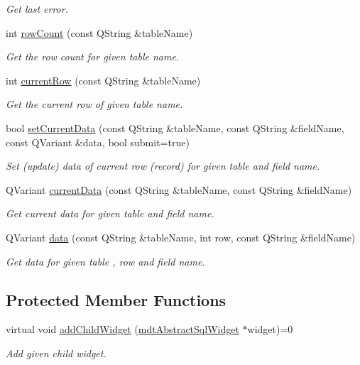 \begin{DoxyCompactItemize}
\begin{DoxyCompactList}\small\item\em Get last error. \end{DoxyCompactList}\item 
int \hyperlink{classmdt_sql_form_old_a859f22cee8de55dbc7111c85ee18cf94}{rowCount} (const QString \&tableName)
\begin{DoxyCompactList}\small\item\em Get the row count for given table name. \end{DoxyCompactList}\item 
int \hyperlink{classmdt_sql_form_old_a02f127ffff2add79efbdbe53b4294fd9}{currentRow} (const QString \&tableName)
\begin{DoxyCompactList}\small\item\em Get the current row of given table name. \end{DoxyCompactList}\item 
bool \hyperlink{classmdt_sql_form_old_a53239c8640705c64ad0d64e1737a0e9b}{setCurrentData} (const QString \&tableName, const QString \&fieldName, const QVariant \&data, bool submit=true)
\begin{DoxyCompactList}\small\item\em Set (update) data of current row (record) for given table and field name. \end{DoxyCompactList}\item 
QVariant \hyperlink{classmdt_sql_form_old_a70bf128500ad9f8a977124ffea58ec80}{currentData} (const QString \&tableName, const QString \&fieldName)
\begin{DoxyCompactList}\small\item\em Get current data for given table and field name. \end{DoxyCompactList}\item 
QVariant \hyperlink{classmdt_sql_form_old_aa86bf23666adb34e71b4a69e60717528}{data} (const QString \&tableName, int row, const QString \&fieldName)
\begin{DoxyCompactList}\small\item\em Get data for given table , row and field name. \end{DoxyCompactList}\end{DoxyCompactItemize}
\subsection*{Protected Member Functions}
\begin{DoxyCompactItemize}
\item 
\hypertarget{classmdt_sql_form_old_a9b34f9398ff12b51768f762f5cd93451}{
virtual void \hyperlink{classmdt_sql_form_old_a9b34f9398ff12b51768f762f5cd93451}{addChildWidget} (\hyperlink{classmdt_abstract_sql_widget}{mdtAbstractSqlWidget} $\ast$widget)=0}
\label{classmdt_sql_form_old_a9b34f9398ff12b51768f762f5cd93451}

\begin{DoxyCompactList}\small\item\em Add given child widget. \end{DoxyCompactList}\end{DoxyCompactItemize}



